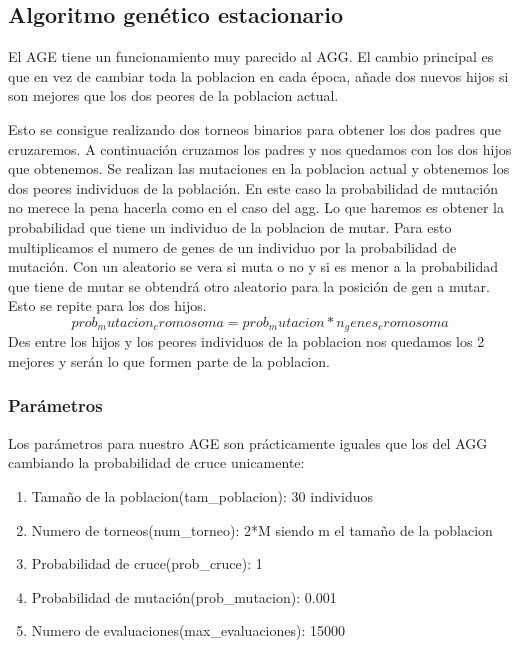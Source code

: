 \documentclass[titlepage]{article}
\begin{document}
	\subsection{Algoritmo genético estacionario}
	El AGE tiene un funcionamiento muy parecido al AGG. El cambio principal es que en vez de cambiar toda la poblacion en cada época, añade dos nuevos hijos si son mejores que los dos peores de la poblacion actual.
	
	Esto se consigue realizando dos torneos binarios para obtener los dos padres que cruzaremos. A continuación cruzamos los padres y nos quedamos con los dos hijos que obtenemos. Se realizan las mutaciones en la poblacion actual y obtenemos los dos peores individuos de la población. En este caso la probabilidad de mutación no merece la pena hacerla como en el caso del agg. Lo que haremos es obtener la probabilidad que tiene un individuo de la poblacion de mutar. Para esto multiplicamos el numero de genes de un individuo por la probabilidad de mutación. Con un aleatorio se vera si muta o no y si es menor a la probabilidad que tiene de mutar se obtendrá otro aleatorio para la posición de gen a mutar. Esto se repite para los dos hijos.
	$$
	prob_mutacion_cromosoma = prob_mutacion * n_genes_cromosoma
	$$
	Des entre los hijos y los peores individuos de la poblacion nos quedamos los 2 mejores y serán lo que formen parte de la poblacion.
	\subsubsection{Parámetros}
	Los parámetros para nuestro AGE son prácticamente iguales que los del AGG cambiando la probabilidad de cruce unicamente:
	\begin{enumerate}
		\item Tamaño de la poblacion(tam\_poblacion): 30 individuos
		\item Numero de torneos(num\_torneo): 2*M siendo m el tamaño de la poblacion
		\item Probabilidad de cruce(prob\_cruce): 1
		\item Probabilidad de mutación(prob\_mutacion): 0.001
		\item Numero de evaluaciones(max\_evaluaciones): 15000
	\end{enumerate}
	\newpage
\end{document}
